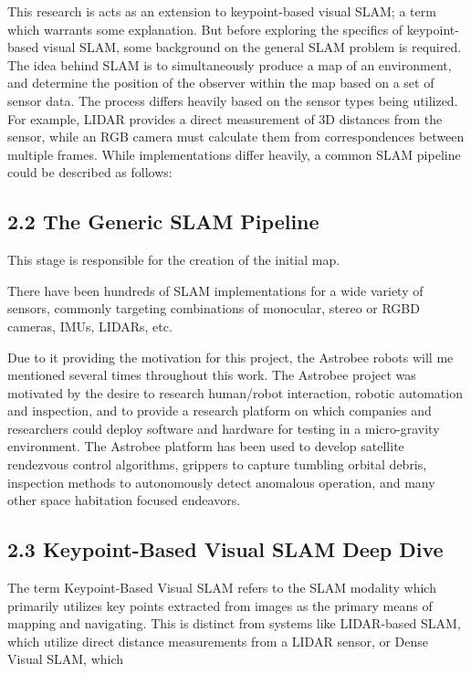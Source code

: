 \documentclass[12pt]{article}
\begin{document}
This research is acts as an extension to keypoint-based visual SLAM; a term which warrants some explanation. But before exploring the specifics of keypoint-based visual SLAM, some background on the general SLAM problem is required. The idea behind SLAM is to simultaneously produce a map of an environment, and determine the position of the observer within the map based on a set of sensor data. The process differs heavily based on the sensor types being utilized. For example, LIDAR provides a direct measurement of 3D distances from the sensor, while an RGB camera must calculate them from correspondences between multiple frames. While implementations differ heavily, a common SLAM pipeline could be described as follows:

\subsection{2.2 The Generic SLAM Pipeline}

This stage is responsible for the creation of the initial map.

There have been hundreds of SLAM implementations for a wide variety of sensors, commonly targeting combinations of monocular, stereo or RGBD cameras, IMUs, LIDARs, etc.

Due to it providing the motivation for this project, the Astrobee robots will me mentioned several times throughout this work. The Astrobee project was motivated by the desire to research human/robot interaction, robotic automation and inspection, and to provide a research platform on which companies and researchers could deploy software and hardware for testing in a micro-gravity environment. The Astrobee platform has been used to develop satellite rendezvous control algorithms, grippers to capture tumbling orbital debris, inspection methods to autonomously detect anomalous operation, and many other space habitation focused endeavors.

\subsection{2.3 Keypoint-Based Visual SLAM Deep Dive}

The term Keypoint-Based Visual SLAM refers to the SLAM modality which primarily utilizes key points extracted from images as the primary means of mapping and navigating. This is distinct from systems like LIDAR-based SLAM, which utilize direct distance measurements from a LIDAR sensor, or Dense Visual SLAM, which
\end{document}
